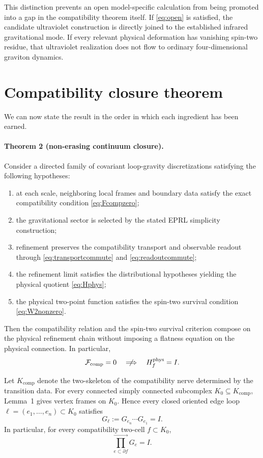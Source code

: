 \documentclass[aps,prd,reprint,nofootinbib,superscriptaddress]{revtex4-2}
\newcommand{\phys}{\mathrm{phys}}
\begin{document}
This distinction prevents an open model-specific calculation from being promoted into a gap in the compatibility theorem itself. If \eqref{eq:open} is satisfied, the candidate ultraviolet construction is directly joined to the established infrared gravitational mode. If every relevant physical deformation has vanishing spin-two residue, that ultraviolet realization does not flow to ordinary four-dimensional graviton dynamics.

\section{Compatibility closure theorem}
\label{sec:closure}

We can now state the result in the order in which each ingredient has been earned.

\paragraph{Theorem 2 (non-erasing continuum closure).}
Consider a directed family of covariant loop-gravity discretizations satisfying the following hypotheses:
\begin{enumerate}[label=(\roman*),leftmargin=2.1em]
\item at each scale, neighboring local frames and boundary data satisfy the exact compatibility condition \eqref{eq:Fcompzero};
\item the gravitational sector is selected by the stated EPRL simplicity construction;
\item refinement preserves the compatibility transport and observable readout through \eqref{eq:transportcommute} and \eqref{eq:readoutcommute};
\item the refinement limit satisfies the distributional hypotheses yielding the physical quotient \eqref{eq:Hphys};
\item the physical two-point function satisfies the spin-two survival condition \eqref{eq:W2nonzero}.
\end{enumerate}
Then the compatibility relation and the spin-two survival criterion compose on the physical refinement chain without imposing a flatness equation on the physical connection. In particular,
\begin{equation}
\mathcal F_{\mathrm{comp}}=0
\quad\centernot\Longrightarrow\quad
H_f^{\phys}=I.
\end{equation}

Let $K_{\mathrm{comp}}$ denote the two-skeleton of the compatibility nerve determined by the transition data. For every connected simply connected subcomplex $K_0\subseteq K_{\mathrm{comp}}$, Lemma~1 gives vertex frames on $K_0$. Hence every closed oriented edge loop $\ell=(e_1,\ldots,e_n)\subset K_0$ satisfies
\begin{equation}
G_{\ell}
:=
G_{e_n}\cdots G_{e_1}
=I.
\label{eq:telescope}
\end{equation}
In particular, for every compatibility two-cell $f\subset K_0$,
\begin{equation}
\boxed{
\overrightarrow{\prod_{e\subset\partial f}}G_e=I.
}
\label{eq:finalmaster}
\end{equation}
\end{document}
